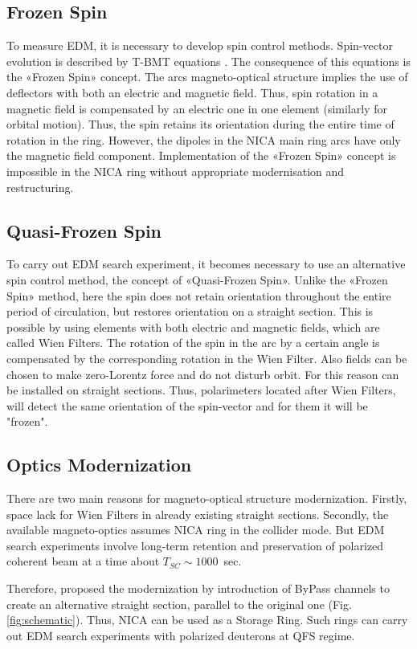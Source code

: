 \documentclass[a4paper,
               keeplastbox,   %
               ]{jacow}
\begin{document}
\subsection{Frozen Spin}

\par To measure EDM, it is necessary to develop spin control methods. Spin-vector evolution is described by T-BMT equations \cite{FS}. The consequence of this equations is the «Frozen Spin» concept. The arcs magneto-optical structure implies the use of deflectors with both an electric and magnetic field. Thus, spin rotation in a magnetic field is compensated by an electric one in one element (similarly for orbital motion). Thus, the spin retains its orientation during the entire time of rotation in the ring. However, the dipoles in the NICA main ring arcs have only the magnetic field component. Implementation of the «Frozen Spin» concept is impossible in the NICA ring without appropriate modernisation and restructuring.

\subsection{Quasi-Frozen Spin}

\par To carry out EDM search experiment, it becomes necessary to use an alternative spin control method, the concept of «Quasi-Frozen Spin»\cite{QFS}. Unlike the «Frozen Spin» method, here the spin does not retain orientation throughout the entire period of circulation, but restores orientation on a straight section. This is possible by using elements with both electric and magnetic fields, which are called Wien Filters. The rotation of the spin in the arc by a certain angle is compensated by the corresponding rotation in the Wien Filter.  Also fields can be chosen to make zero-Lorentz force and do not disturb orbit. For this reason can be installed on straight sections. Thus, polarimeters located after Wien Filters, will detect the same orientation of the spin-vector and for them it will be "frozen".

\subsection{Optics Modernization}

\par There are two main reasons for magneto-optical structure modernization. Firstly, space lack for Wien Filters in already existing straight sections. Secondly, the available magneto-optics assumes NICA ring in the collider mode. But EDM search experiments involve long-term retention and preservation of polarized coherent beam at a time about $T_{SC}\sim1000$~sec.
\par Therefore, proposed the modernization by introduction of ByPass channels to create an alternative straight section, parallel to the original one (Fig. \ref{fig:schematic}). Thus, NICA can be used as a Storage Ring. Such rings can carry out EDM search experiments with polarized deuterons at QFS regime.
\end{document}
